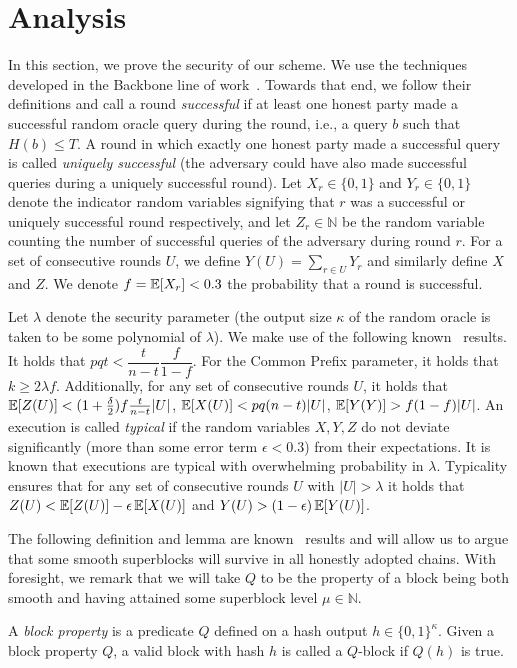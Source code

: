 \section{Analysis}\label{sec:analysis}
In this section, we prove the security of our scheme. We use the techniques
developed in the Backbone line of work~\cite{backbone}. Towards that end, we
follow their definitions and call a round \emph{successful} if at least one
honest party made a successful random oracle query during the round, i.e., a
query $b$ such that $H(b) \leq T$. A round in which exactly one honest party
made a successful query is called \emph{uniquely successful} (the adversary
could have also made successful queries during a uniquely successful round). Let
$X_r \in \{0, 1\}$ and $Y_r \in \{0, 1\}$ denote the indicator random variables
signifying that $r$ was a successful or uniquely successful round respectively,
and let $Z_r \in \mathbb{N}$ be the random variable counting the number of
successful queries of the adversary during round $r$. For a set of consecutive
rounds $U$, we define $Y(U) = \sum_{r \in U} Y_r$ and similarly define $X$ and
$Z$. We denote $f = \operatorname{\mathbb{E}}[X_r] < 0.3$ the probability that a round is successful.

Let $\lambda$ denote the security parameter (the output size $\kappa$ of the
random oracle is taken to be some polynomial of $\lambda$).
We make use of the following known~\cite{backbone} results.
It holds that $pqt < \dfrac{t}{n-t} \dfrac{f}{1-f}$. For the Common Prefix
parameter, it holds that $k \geq 2\lambda f$.
Additionally, for any set of
consecutive rounds $U$, it holds that
$\operatorname{\mathbb{E}}[Z(U)] < (1 + \frac{\delta}{2})f\frac{t}{n - t}|U|$,
$\operatorname{\mathbb{E}}[X(U)] < pq(n - t)|U|$,
$\operatorname{\mathbb{E}}[Y(Y)] > f(1 - f)|U|$.
An execution is called \emph{typical}
if the random variables $X, Y, Z$ do not deviate significantly (more than some
error term $\epsilon < 0.3$) from their expectations. It is known that
executions are typical with overwhelming probability in
$\lambda$. Typicality ensures that for any set of consecutive
rounds $U$ with $|U| > \lambda$ it holds that
$Z(U) < \operatorname{\mathbb{E}}[Z(U)] - \epsilon\operatorname{\mathbb{E}}[X(U)]$ and
$Y(U) > (1 - \epsilon)\operatorname{\mathbb{E}}[Y(U)]$.

The following definition and lemma are known~\cite{dionyziz} results and will
allow us to argue that some smooth superblocks will survive in all honestly
adopted chains. With foresight, we remark that we will take $Q$ to be the
property of a block being both smooth and having attained some superblock level
$\mu \in \mathbb{N}$.

\begin{definition}
    A \emph{block property} is a predicate $Q$ defined on a hash output $h \in \{ 0, 1 \}^\kappa$. Given a block property $Q$, a valid block with hash $h$ is called a $Q$-block if $Q(h)$ is true.
\end{definition}

